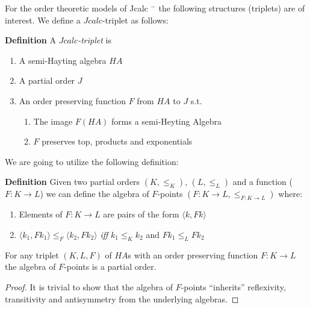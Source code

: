 			For the order theoretic models of  Jcalc $^{-}$ the following structures (triplets) 
			are of interest. We define a $Jcalc$-triplet as follows:
			\begin{mdframed}
				\textbf{Definition}
			A \emph{$Jcalc$-triplet} is 
				
			\begin{enumerate}
			\item A semi-Hayting algebra $HA$
			\item A partial order $J$
			\item An order preserving function $F$ from $HA$ to $J$ s.t.
			\begin{enumerate}
				\item The image $F(HA)$ forms a semi-Heyting Algebra
				\item $F$ preserves top, products and exponentials
			\end{enumerate}
			\end{enumerate}
			\end{mdframed}
			We are going to utilize the following definition: 
			\begin{mdframed}
				\textbf{Definition}
				Given two partial orders $(K,\le_{K})$, $(L,\le_{L})$ and a function ($F: K\rightarrow L$) 
				we can define the algebra of $F$-points  $(F:K \rightarrow L,\le_{F:K\rightarrow L})$
				where:
				\begin{enumerate}
					\item Elements of $F:K\rightarrow L$ are  pairs of the form $\langle k,Fk \rangle$
					\item $\langle k_1,Fk_1 \rangle \le_F \langle k_2, Fk_2\rangle$ \textit{iff}  $k_1\le_{K}k_2$ and $Fk_1\le_{L}Fk_2$ 
				\end{enumerate}
			\end{mdframed}

			\begin{theorem}
				For any triplet $(K, L, F)$ of $HA$s with an order 
				preserving function $F:K\rightarrow L$
				the algebra of $F$-points is a partial order.
			\end{theorem}
			\begin{proof}
				It is trivial to show that the algebra of $F$-points ``inherits'' reflexivity, 
				transitivity and antisymmetry from the underlying algebras.
			\end{proof}

